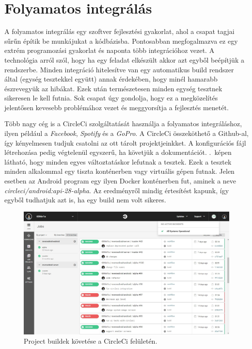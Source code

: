 \documentclass{thesis-ekf}
\theoremstyle{definition}
\theoremstyle{remark}
\begin{document}
\section{Folyamatos integrálás}

A folyamatos integrálás egy szoftver fejlesztési gyakorlat, ahol a csapat tagjai sűrűn építik be munkájukat a kódbázisba.
Pontosabban megfogalmazva ez egy extrém programozási gyakorlat és naponta több integrációhoz vezet.
A technológia arról szól, hogy ha egy feladat elkészült akkor azt egyből beépítjük a rendszerbe.
Minden integráció hitelesítve van egy automatikus build rendszer által (egység tesztekkel együtt) annak érdekében, hogy minél hamarabb észrevegyük az hibákat.
Ezek után természetesen minden egység tesztnek sikeresen le kell futnia.
Sok csapat úgy gondolja, hogy ez a megközelítés jelentősen kevesebb problémához vezet és meggyorsítja a fejlesztés menetét.\cite{continuous_integration}

Több nagy cég is a CircleCi szolgáltatását használja a folyamatos integráláshoz, ilyen például a \emph{Facebook}, \emph{Spotify} és a \emph{GoPro}.
A CircleCi összeköthető a Github-al, így kényelmesen tudjuk csatolni az ott tárolt projektjeinkket.
A konfigurációs fájl létrehozása pedig végtelenül egyszerű, ha követjük a dokumentációt.
.~képen látható, hogy minden egyes változtatáskor lefutnak a tesztek.
Ezek a tesztek minden alkalommal egy tiszta konténerben vagy virtuális gépen futnak.
Jelen esetben az Android program egy ilyen Docker konténerben fut, aminek a neve \emph{circleci/android:api-28-alpha}.
Az eredményről mindig értesítést kapunk, így egyből tudhatjuk azt is, ha egy build nem volt sikeres.

\begin{figure}[!h]
	\centering
	\includegraphics[width=15cm]{pictures/circleci}
	\caption{Project buildek követése a CircleCi felületén.}
	\label{circleci}
\end{figure}
\end{document}
